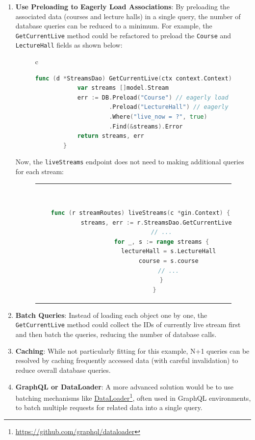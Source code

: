\begin{enumerate}

\item \textbf{Use Preloading to Eagerly Load Associations}: By preloading the associated data (courses and lecture halls) in a single query, the number of database queries can be reduced to a minimum. For example, the \texttt{GetCurrentLive} method could be refactored to preload the \texttt{Course} and \texttt{LectureHall} fields as shown below:

    \begin{figure}[htpb]
      \begin{tabular}{c}
      \ \small \begin{lstlisting}[language=Go]
        func (d *StreamsDao) GetCurrentLive(ctx context.Context) ([]model.Stream, error) {
            var streams []model.Stream
            err := DB.Preload("Course") // eagerly load stream's course
                     .Preload("LectureHall") // eagerly load stream's lecturehalls
                     .Where("live_now = ?", true)
                     .Find(&streams).Error
            return streams, err
        }
      \end{lstlisting}
      \end{tabular}
    \end{figure}

Now, the \texttt{liveStreams} endpoint does not need to making additional queries for each stream:
    
    \begin{figure}[htpb]
      \begin{tabular}{c}
      \ \small \begin{lstlisting}[language=Go]
        func (r streamRoutes) liveStreams(c *gin.Context) {
            streams, err := r.StreamsDao.GetCurrentLive(c)
            // ...
            for _, s := range streams {
                lectureHall = s.LectureHall
                course = s.course
                // ...
            }
        }
      \end{lstlisting}
      \end{tabular}
    \end{figure}

    \item \textbf{Batch Queries}: Instead of loading each object one by one, the \texttt{GetCurrentLive} method could collect the IDs of currently live stream first and then batch the queries, reducing the number of database calls.

    \item \textbf{Caching}: While not particularly fitting for this example, N+1 queries can be resolved by caching frequently accessed data (with careful invalidation) to reduce overall database queries.

    \item \textbf{GraphQL or DataLoader}: A more advanced solution would be to use batching mechanisms like \href{https://github.com/graphql/dataloader}{DataLoader}\footnote{\url{https://github.com/graphql/dataloader}}, often used in GraphQL environments, to batch multiple requests for related data into a single query.
\end{enumerate}


